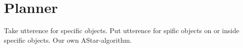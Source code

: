 \section*{Planner}
Take utterence for specific objects.
Put utterence for spific objects on or inside specific objects.
Our own AStar-algorithm.


